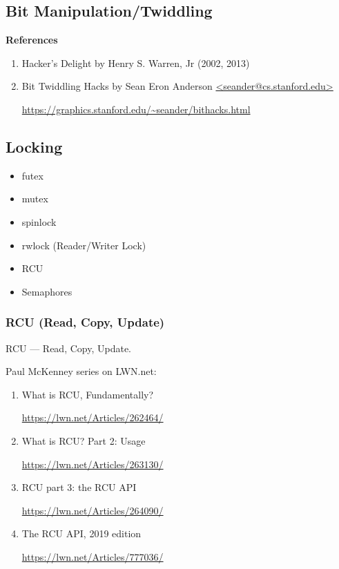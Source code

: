 \documentclass[12pt,a4paper]{article}
\begin{document}
\subsection{Bit Manipulation/Twiddling}

\textbf{References}

\begin{enumerate}
\item Hacker's Delight by Henry S. Warren, Jr (2002, 2013)

\item Bit Twiddling Hacks by Sean Eron Anderson \url{<seander@cs.stanford.edu>}

    \small
    \url{https://graphics.stanford.edu/~seander/bithacks.html}

\end{enumerate}

\subsection{Locking}

\begin{itemize}
\item futex
\item mutex
\item spinlock
\item rwlock (Reader/Writer Lock)
\item RCU
\item Semaphores
\end{itemize}

\subsubsection{RCU (Read, Copy, Update)}

RCU --- Read, Copy, Update.

Paul McKenney series on LWN.net:

\begin{enumerate}
\item What is RCU, Fundamentally?

    \url{https://lwn.net/Articles/262464/}

\item What is RCU? Part 2: Usage

    \url{https://lwn.net/Articles/263130/}

\item RCU part 3: the RCU API

    \url{https://lwn.net/Articles/264090/}

\item The RCU API, 2019 edition

    \url{https://lwn.net/Articles/777036/}

\end{enumerate}
\end{document}
